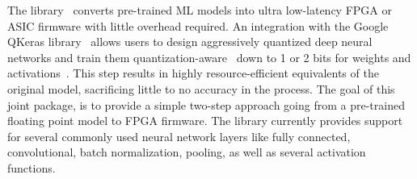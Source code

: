 The \hlsfml library~\cite{Duarte:2018ite,aarrestad2021fast,DiGuglielmo:2020eqx,Coelho:2020zfu} converts pre-trained ML models into ultra low-latency FPGA or ASIC firmware with little overhead required. An integration with the Google QKeras library~\cite{qkeras} allows users to design aggressively quantized deep neural networks and train them quantization-aware~\cite{Coelho:2020zfu} down to 1 or 2 bits for weights and activations~\cite{DiGuglielmo:2020eqx}. This step results in highly resource-efficient equivalents of the original model, sacrificing little to no accuracy in the process. The goal of this joint package, is to provide a simple two-step approach going from a pre-trained floating point model to FPGA firmware.
The \hlsfml library currently provides support for several commonly used neural network layers like fully connected, convolutional, batch normalization, pooling, as well as several activation functions.
